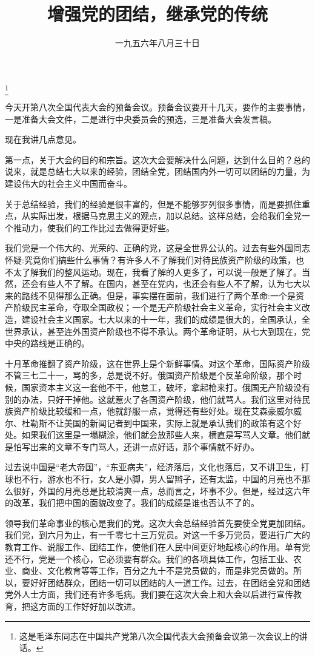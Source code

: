 
\title{增强党的团结，继承党的传统}
\date{一九五六年八月三十日}
\thanks{这是毛泽东同志在中国共产党第八次全国代表大会预备会议第一次会议上的讲话。}
\maketitle


今天开第八次全国代表大会的预备会议。预备会议要开十几天，要作的主要事情，一是准备大会文件，二是进行中央委员会的预选，三是准备大会发言稿。

现在我讲几点意见。

第一点，关于大会的目的和宗旨。这次大会要解决什么问题，达到什么目的？总的说来，就是总结七大以来的经验，团结全党，团结国内外一切可以团结的力量，为建设伟大的社会主义中国而奋斗。

关于总结经验，我们的经验是很丰富的，但是不能够罗列很多事情，而是要抓住重点，从实际出发，根据马克思主义的观点，加以总结。这样总结，会给我们全党一个推动力，使我们的工作比过去做得更好些。

我们党是一个伟大的、光荣的、正确的党，这是全世界公认的。过去有些外国同志怀疑:究竟你们搞些什么事情？有许多人不了解我们对待民族资产阶级的政策，也不太了解我们的整风运动。现在，我看了解的人更多了，可以说一般是了解了。当然，还会有些人不了解。在国内，甚至在党内，也还会有些人不了解，认为七大以来的路线不见得那么正确。但是，事实摆在面前，我们进行了两个革命:一个是资产阶级民主革命，夺取全国政权；一个是无产阶级社会主义革命，实行社会主义改造，建设社会主义国家。七大以来的十一年，我们的成绩是很大的，全国承认，全世界承认，甚至连外国资产阶级也不得不承认。两个革命证明，从七大到现在，党中央的路线是正确的。

十月革命推翻了资产阶级，这在世界上是个新鲜事情。对这个革命，国际资产阶级不管三七二十一，骂的多，总是说不好。俄国资产阶级是个反革命阶级，那个时候，国家资本主义这一套他不干，他怠工，破坏，拿起枪来打。俄国无产阶级没有别的办法，只好干掉他。这就惹火了各国资产阶级，他们就骂人。我们这里对待民族资产阶级比较缓和一点，他就舒服一点，觉得还有些好处。现在艾森豪威尔威尔、杜勒斯不让美国的新闻记者到中国来，实际上就是承认我们的政策有这个好处。如果我们这里是一塌糊涂，他们就会放那些人来，横直是写骂人文章。他们就是怕写出来的文章不专门骂人，还讲一点好话，那个事情就不好办。

过去说中国是“老大帝国”，“东亚病夫”，经济落后，文化也落后，又不讲卫生，打球也不行，游水也不行，女人是小脚，男人留辫子，还有太监，中国的月亮也不那么很好，外国的月亮总是比较清爽一点，总而言之，坏事不少。但是，经过这六年的改革，我们把中国的面貌改变了。我们的成绩是谁也否认不了的。

领导我们革命事业的核心是我们的党。这次大会总结经验首先要使全党更加团结。我们党，到六月为止，有一千零七十三万党员。对这一千多万党员，要进行广大的教育工作、说服工作、团结工作，使他们在人民中间更好地起核心的作用。单有党还不行，党是一个核心，它必须要有群众。我们的各项具体工作，包括工业、农业、商业、文化教育等等工作，百分之九十不是党员做的，而是非党员做的。所以，要好好团结群众，团结一切可以团结的人一道工作。过去，在团结全党和团结党外人士方面，我们还有许多毛病。我们要在这次大会上和大会以后进行宣传教育，把这方面的工作好好加以改进。


